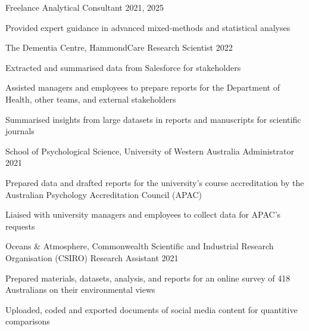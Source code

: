 \begin{cventries}
  \cventry
    {Freelance} %
    {Analytical Consultant} %
    {}%
    {2021, 2025} %
    { %
      \begin{cvitems}
        \item Provided expert guidance in advanced mixed-methods and statistical analyses
      \end{cvitems}
    }

  \cventry
    {The Dementia Centre, HammondCare} %
    {Research Scientist} %
    {}%
    {2022} %
    { %
      \begin{cvitems}
        \item Extracted and summarised data from Salesforce for stakeholders
         \item Assisted managers and employees to prepare reports for the Department of Health, other teams, and external stakeholders
         \item Summarised insights from large datasets in reports and manuscripts for scientific journals  
      \end{cvitems}
    }

  \cventry
    {School of Psychological Science, University of Western Australia} %
    {Administrator} %
    {}%
    {2021} %
    { %
      \begin{cvitems}
        \item Prepared data and drafted reports for the university's course accreditation by the Australian Psychology Accreditation Council (APAC)
        \item Liaised with university managers and employees to collect data for APAC's requests
      \end{cvitems}
    }
    
  \cventry
    {Oceans \& Atmosphere, Commonwealth Scientific and Industrial Research Organisation (CSIRO)} %
    {Research Assistant} %
    {}%
    {2021} %
    { %
      \begin{cvitems}
        \item Prepared materials, datasets, analysis, and reports for an online survey of 418 Australians on their environmental views
        \item Uploaded, coded and exported documents of social media content for quantitive comparisons
      \end{cvitems}
    }


\end{cventries}
